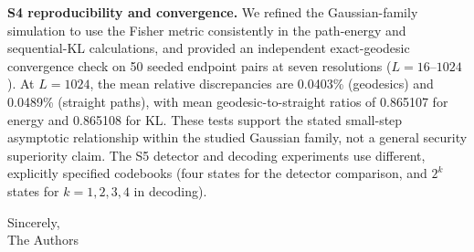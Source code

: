 \documentclass[12pt,a4paper]{article}
\begin{document}
\bigskip
\par\noindent\textbf{S4 reproducibility and convergence.} We refined the Gaussian-family simulation to use the Fisher metric consistently in the path-energy and sequential-KL calculations, and provided an independent exact-geodesic convergence check on 50 seeded endpoint pairs at seven resolutions ($L=16$--$1024$). At $L=1024$, the mean relative discrepancies are 0.0403\% (geodesics) and 0.0489\% (straight paths), with mean geodesic-to-straight ratios of 0.865107 for energy and 0.865108 for KL. These tests support the stated small-step asymptotic relationship within the studied Gaussian family, not a general security superiority claim. The S5 detector and decoding experiments use different, explicitly specified codebooks (four states for the detector comparison, and $2^k$ states for $k=1,2,3,4$ in decoding).\par

\noindent Sincerely,\\
The Authors
\end{document}
